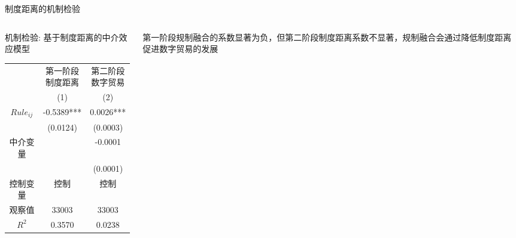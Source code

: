 \documentclass{beamer}
\begin{document}
\begin{frame}{制度距离的机制检验}
    \begin{columns}[T]
        \begin{column}{0.7\textwidth}
            \centering
            \begin{threeparttable}
                \caption{机制检验: 基于制度距离的中介效应模型}
                \begin{tabular}{ccc}
                    \toprule
                    & \makecell[c]{第一阶段 \\ 制度距离} & \makecell[c]{第二阶段 \\ 数字贸易} \\
                    & (1) & (2) \\
                    \midrule
                    $Rule_{ij}$ & -0.5389*** & 0.0026*** \\
                    & (0.0124) & (0.0003) \\
                    中介变量 & & -0.0001 \\
                    & & (0.0001) \\
                    控制变量 & 控制 & 控制 \\
                    观察值 & 33003 & 33003 \\
                    $R^2$ & 0.3570 & 0.0238 \\
                    \bottomrule
                \end{tabular}
            \end{threeparttable}
        \end{column}
        \begin{column}{0.3\textwidth}
            \begin{tcolorbox}[colback=lightyellow,colframe=deepblue,coltext=black]
                第一阶段规制融合的系数显著为负，但第二阶段制度距离系数不显著，规制融合会通过降低制度距离促进数字贸易的发展
            \end{tcolorbox}
        \end{column}
    \end{columns}
\end{frame}
\end{document}
